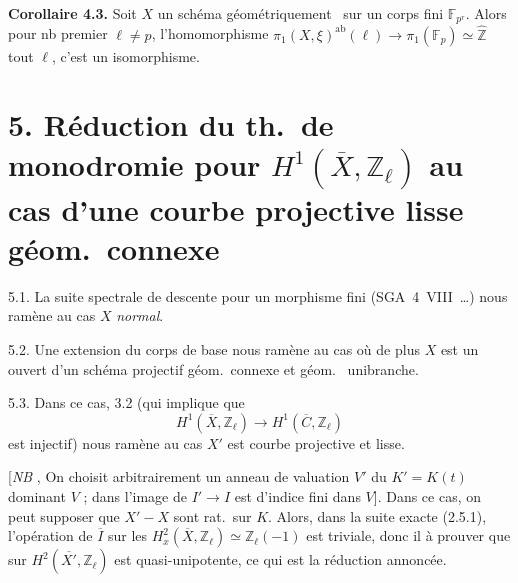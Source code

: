 \documentclass[11pt,a4paper]{article}
\begin{document}
\textbf{Corollaire 4.3.} Soit $X$ un schéma  géométriquement  \ sur un corps fini $\mathbb{F}_{p^r}$. Alors pour  nb premier $\ell \neq p$, l'homomorphisme $\pi_1(X,\xi)^{\mathrm{ab}}(\ell) \to \pi_1(\mathbb{F}_p) \simeq \hat{\mathbb{Z}}$ \struck{\ill{}}  tout $\ell$, c'est un isomorphisme.

\section*{5. Réduction du th.\ de monodromie pour $H^1(\overline{X}, \mathbb{Z}_\ell)$ au cas d'une courbe projective lisse géom.\ connexe}

5.1. La suite spectrale de \struck{\ill{}} descente pour un morphisme fini (SGA~4~VIII~…) nous ramène au cas $X$ \emph{normal}.

5.2.  Une extension \struck{\ill{}}  du corps de base nous ramène au cas où de plus $X$ est un ouvert d'un schéma projectif  \struck{\ill{}} géom.\ connexe et géom.\  unibranche.

5.3. Dans ce cas, 3.2 (qui implique que
\[
  H^1(\overline{X}, \mathbb{Z}_\ell) \to H^1(\overline{C}, \mathbb{Z}_\ell)
\]
est injectif) nous ramène au cas  $X'$ est  courbe \struck{\ill{}} projective et lisse.

[\emph{NB} , On choisit arbitrairement un anneau de valuation $V'$ du $K' = K(t)$ \add{\uncertain{\ill{}}} dominant $V$ ; dans l'image de $I' \to I$ est d'indice fini dans $V$]. Dans ce cas,  on peut  supposer que  $X' - X$ sont rat.\ sur $K$. Alors, dans la suite exacte (2.5.1), l'opération de $\overline{I}$ sur les $H^2_{x}(\overline{X}, \mathbb{Z}_\ell) \simeq \mathbb{Z}_\ell(-1)$ est triviale, donc il  à prouver que  sur $H^2(\overline{X'}, \mathbb{Z}_\ell)$ est quasi-unipotente, ce qui est la réduction annoncée.
\end{document}
